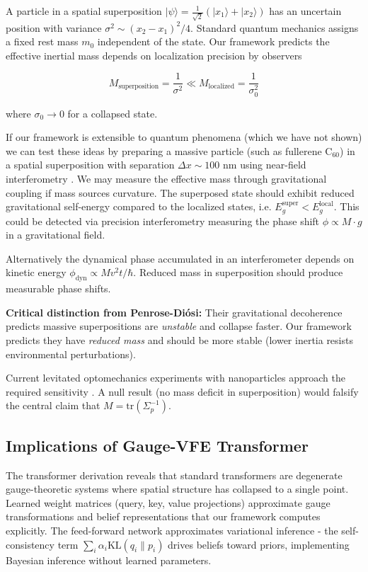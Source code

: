 \documentclass[11pt]{article}
\begin{document}
A particle in a spatial superposition $|\psi\rangle = \frac{1}{\sqrt{2}}(|x_1\rangle + |x_2\rangle)$ has an uncertain position with variance $\sigma^2 \sim (x_2-x_1)^2/4$. Standard quantum mechanics assigns a fixed rest mass $m_0$ independent of the state. Our framework predicts the effective inertial mass depends on localization precision by observers

\begin{equation}
M_{\text{superposition}} = \frac{1}{\sigma^2} \ll M_{\text{localized}} = \frac{1}{\sigma_0^2}
\end{equation}

where $\sigma_0 \to 0$ for a collapsed state.

If our framework is extensible to quantum phenomena (which we have not shown) we can test these ideas by preparing a massive particle (such as fullerene C$_{60}$) in a spatial superposition with separation $\Delta x \sim 100$ nm using near-field interferometry \cite{Arndt2014}. We may measure the effective mass through gravitational coupling if mass sources curvature. The superposed state should exhibit reduced gravitational self-energy compared to the localized states, i.e.  
$E_g^{\text{super}} < E_g^{\text{local}}$. This could be detected via precision interferometry measuring the phase shift $\phi \propto M \cdot g$ in a gravitational field.

Alternatively the dynamical phase accumulated in an interferometer depends on kinetic energy $\phi_{\text{dyn}} \propto M v^2 t/\hbar$. Reduced mass in superposition should produce measurable phase shifts.

\textbf{Critical distinction from Penrose-Diósi:} Their gravitational decoherence predicts massive superpositions are \emph{unstable} and collapse faster. Our framework predicts they have \emph{reduced mass} and should be more stable (lower inertia resists environmental perturbations). 

Current levitated optomechanics experiments with nanoparticles approach the required sensitivity \cite{Bateman2014, Millen2020}. A null result (no mass deficit in superposition) would falsify the central claim that $M = \mathrm{tr}(\Sigma_p^{-1})$.




\subsection{Implications of Gauge-VFE Transformer}

The transformer derivation reveals that standard transformers are degenerate gauge-theoretic systems where spatial structure has collapsed to a single point. Learned weight matrices (query, key, value projections) approximate gauge transformations and belief representations that our framework computes explicitly. The feed-forward network approximates variational inference - the self-consistency term $\sum_i \alpha_i \mathrm{KL}(q_i \| p_i)$ drives beliefs toward priors, implementing Bayesian inference without learned parameters.
\end{document}
